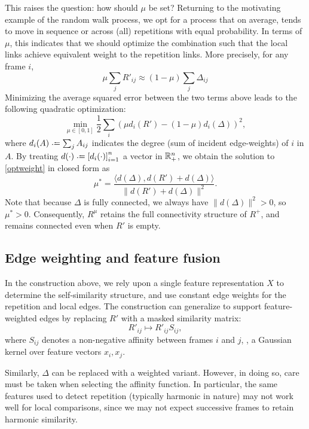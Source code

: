 \documentclass{article}
\begin{document}
This raises the question: how should $\mu$ be set?  Returning to the motivating
example of the random walk process, we opt for a process that on average, tends to
move in sequence or across (all) repetitions with equal probability.  In terms of
$\mu$, this indicates that we should optimize the combination such that the local
links achieve equivalent weight to the repetition links.  More precisely, for any 
frame $i$,
$$
\mu \sum_j R'_{ij} \approx (1-\mu) \sum_j \Delta_{ij} 
$$
Minimizing the average squared error between the two terms above leads to the
following quadratic optimization:
\begin{equation}
\min_{\mu \in [0, 1]} \frac{1}{2} \sum_i {(\mu d_i(R') - (1 - \mu)d_i(\Delta))}^2,\label{optweight}
\end{equation}
where $d_i(A) \defeq \sum_j A_{ij}$ indicates the degree (sum of incident edge-weights) 
of $i$ in $A$. By treating $d(\cdot) \defeq {[d_i(\cdot)]}_{i=1}^n$ a vector in 
$\mathbb{R}^n_+$, we obtain the solution to \cref{optweight} in closed form as
\begin{equation}
\mu^* = \frac{\langle d(\Delta), d(R') + d(\Delta)\rangle}{\|d(R') +
d(\Delta)\|^2}.\label{optweight:solution}
\end{equation}
Note that because $\Delta$ is fully connected, we always have $\|d(\Delta)\|^2 > 0$,
so $\mu^* > 0$.  Consequently, $R^\mu$ retains the full connectivity structure
of $R^+$, and remains connected even when $R'$ is empty.

\subsection{Edge weighting and feature fusion}
In the construction above, we rely upon a single feature representation $X$ to 
determine the self-similarity structure, and use constant edge weights for the
repetition and local edges.  The construction can generalize to support
feature-weighted edges by replacing $R'$ with a masked similarity matrix:
\begin{equation}
R'_{ij} \mapsto R'_{ij} S_{ij},
\end{equation}
where $S_{ij}$ denotes a non-negative affinity between frames $i$ and $j$, \eg,
a Gaussian kernel over feature vectors $x_i, x_j$.

Similarly, $\Delta$ can be replaced with a weighted variant.  However, in doing so,
care must be taken when selecting the affinity function.  In particular, the same
features used to detect repetition (typically harmonic in nature) may not work well
for local comparisons, since we may not expect successive frames to retain
harmonic similarity.  
\end{document}
